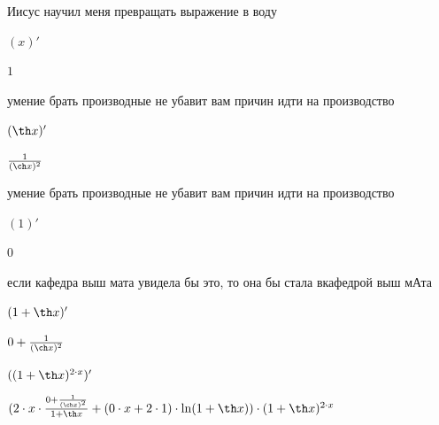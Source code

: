 \documentclass[a4paper,12pt]{article}
\begin{document}
Иисус научил меня превращать выражение в воду 

\begin{center}$(x)'$

\end{center}



\begin{center}$1$

\end{center}

умение брать производные не убавит вам причин идти на производство 

\begin{center}$( \th x)'$

\end{center}



\begin{center}$ \frac{1}{( \ch x)^{2}} $

\end{center}

умение брать производные не убавит вам причин идти на производство 

\begin{center}$(1)'$

\end{center}



\begin{center}$0$

\end{center}

если кафедра выш мата увидела бы это, то она бы стала вкафедрой выш мАта 

\begin{center}$(1+ \th x)'$

\end{center}



\begin{center}$0+ \frac{1}{( \ch x)^{2}} $

\end{center}

  

\begin{center}$((1+ \th x)^{2 \cdot x})'$

\end{center}



\begin{center}$(2 \cdot x \cdot  \frac{0+ \frac{1}{( \ch x)^{2}} }{1+ \th x} +(0 \cdot x+2 \cdot 1) \cdot  \ln (1+ \th x)) \cdot (1+ \th x)^{2 \cdot x}$

\end{center}
\end{document}
